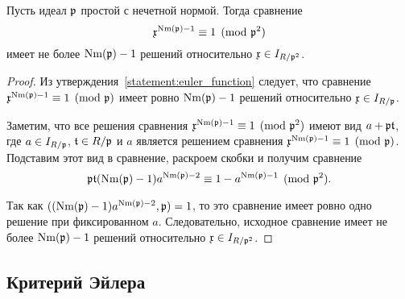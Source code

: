 \documentclass[_00_dissertation.tex]{subfiles}
\begin{document}
\begin{proposition}\label{proposition:miller_criteria_character}
    Пусть идеал $\mathfrak{p}$ простой с нечетной нормой.
    Тогда сравнение
    \begin{equation*}
        \mathfrak{x}^{\textrm{Nm}(\mathfrak{p}) - 1} \equiv 1 \pmod{\mathfrak{p}^2}
    \end{equation*}
    имеет не более $\textrm{Nm}(\mathfrak{p}) - 1$ решений относительно $\mathfrak{x} \in I_{R/\mathfrak{p}^2}$.
\end{proposition}
\begin{proof}
    Из утверждения~\ref{statement:euler_function} следует, что сравнение $\mathfrak{x}^{\textrm{Nm}(\mathfrak{p}) - 1} \equiv 1 \pmod{\mathfrak{p}}$ имеет ровно $\textrm{Nm}(\mathfrak{p}) - 1$ решений относительно $\mathfrak{x} \in I_{R/\mathfrak{p}}$.
    
    Заметим, что все решения сравнения $\mathfrak{x}^{\textrm{Nm}(\mathfrak{p}) - 1} \equiv 1 \pmod{\mathfrak{p}^2}$ имеют вид $a + \mathfrak{p}\mathfrak{t}$, где $a \in I_{R/\mathfrak{p}}$, $\mathfrak{t} \in R/\mathfrak{p}$ и $a$ является решением сравнения $\mathfrak{x}^{\textrm{Nm}(\mathfrak{p}) - 1} \equiv 1 \pmod{\mathfrak{p}}$.
    Подставим этот вид в сравнение, раскроем скобки и получим сравнение
    \begin{equation*}
        \mathfrak{p}\mathfrak{t}(\textrm{Nm}(\mathfrak{p}) - 1)a^{\textrm{Nm}(\mathfrak{p}) - 2} \equiv 1 - a^{\textrm{Nm}(\mathfrak{p}) - 1} \pmod{\mathfrak{p}^2}.
    \end{equation*}
    
    Так как $((\textrm{Nm}(\mathfrak{p}) - 1)a^{\textrm{Nm}(\mathfrak{p}) - 2}, \mathfrak{p}) = 1$, то это сравнение имеет ровно одно решение при фиксированном $a$.
    Следовательно, исходное сравнение имеет не более $\textrm{Nm}(\mathfrak{p}) - 1$ решений относительно $\mathfrak{x} \in I_{R/\mathfrak{p}^2}$.
\end{proof}

\subsection{Критерий Эйлера}
\end{document}
